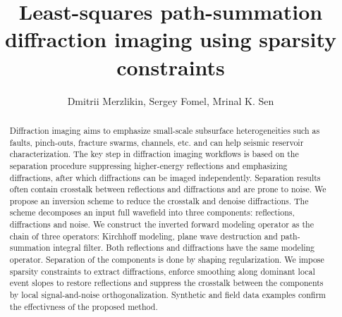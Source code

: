 \renewcommand{\thefootnote}{\fnsymbol{footnote}}

\title{Least-squares path-summation diffraction imaging using sparsity constraints}

\author{Dmitrii Merzlikin\footnotemark[1], 
	Sergey Fomel\footnotemark[1],
        Mrinal K. Sen\footnotemark[2]}
\maketitle

\address{
\footnotemark[1] Bureau of Economic Geology \\
John A. and Katherine G. Jackson School of Geosciences \\
The University of Texas at Austin \\
University Station, Box X \\
Austin, Texas 78713-8924, USA \\
\footnotemark[2] Institute for Geophysics \\
John A. and Katherine G. Jackson School of Geosciences \\
The University of Texas at Austin \\
J.J. Pickle Research Campus, Bldg. 196 \\
10100 Burnet Road (R2200)\\
Austin, Texas 78758-4445, USA \\
}



\begin{abstract}
Diffraction imaging aims to emphasize small-scale subsurface heterogeneities such as faults,
pinch-outs, fracture swarms, channels, etc. and can help
seismic reservoir characterization. The key step in diffraction imaging workflows is based on the separation procedure
suppressing higher-energy reflections and emphasizing diffractions, after which
diffractions can be imaged independently. Separation results often contain crosstalk between reflections and diffractions
and are prone to noise.
We propose an inversion scheme to reduce the crosstalk and denoise diffractions. The scheme
decomposes an input full wavefield into three components: reflections, diffractions and noise.
We construct the inverted forward modeling operator
as the chain of three operators: Kirchhoff modeling, plane wave destruction and
path-summation integral filter. Both reflections and diffractions have the same modeling operator. Separation of the components
is done by shaping regularization. We impose sparsity constraints to extract diffractions,
enforce smoothing along dominant local event slopes to restore reflections and
suppress the crosstalk between the components by local signal-and-noise orthogonalization. 
Synthetic and field data examples confirm the effectivness of the proposed method. 
\end{abstract}

